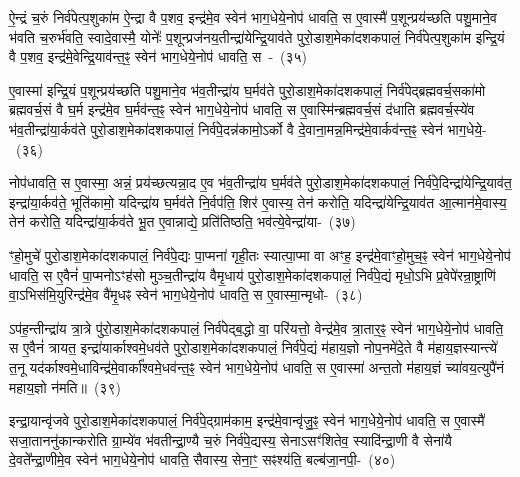 ऐ॒न्द्रं च॒रुं निर्व॑पेत्प॒शुका॑म ऐ॒न्द्रा वै प॒शव॒ इन्द्र॑मे॒व स्वेन॑ भाग॒\-धेये॒नोप॑ धावति॒ स ए॒वास्मै॑ प॒शून्प्रय॑च्छति पशु॒माने॒व भ॑वति च॒रुर्भ॑वति॒ स्वादे॒वास्मै॒ योनेः᳚ प॒शून्प्रज॑नय॒तीन्द्रा॑येन्द्रि॒याव॑ते पुरो॒डाश॒मेका॑\-दश\-कपालं॒ निर्व॑पेत्प॒शुका॑म इन्द्रि॒यं वै प॒शव॒ इन्द्र॑मे॒वेन्द्रि॒याव॑न्त॒ꣴ॒ स्वेन॑ भाग॒\-धेये॒नोप॑ धावति॒ स~-~(३५)\ip

ए॒वास्मा॑ इन्द्रि॒यं प॒शून्प्रय॑च्छति पशु॒माने॒व भ॑व॒तीन्द्रा॑य घ॒र्मव॑ते पुरो॒डाश॒मेका॑\-दश\-कपालं॒ निर्व॑पेद्ब्रह्मवर्च॒सका॑मो ब्रह्मवर्च॒सं वै घ॒र्म इन्द्र॑मे॒व घ॒र्मव॑न्त॒ꣴ॒ स्वेन॑ भाग॒\-धेये॒नोप॑ धावति॒ स ए॒वास्मि॑न्ब्रह्मवर्च॒सं द॑धाति ब्रह्मवर्च॒स्ये॑व भ॑व॒तीन्द्रा॑या॒र्कव॑ते पुरो॒डाश॒मेका॑\-दश\-कपालं॒ निर्व॑पे॒दन्न॑कामो॒\-ऽर्को वै दे॒वाना॒मन्न॒मिन्द्र॑मे॒वार्कव॑न्त॒ꣴ॒ स्वेन॑ भाग॒\-धेये॒-~(३६)\ip

नोप॑धावति॒ स ए॒वास्मा॒ अन्नं॒ प्रय॑च्छत्यन्ना॒द ए॒व भ॑व॒तीन्द्रा॑य घ॒र्मव॑ते पुरो॒डाश॒मेका॑\-दश\-कपालं॒ निर्व॑पे॒दिन्द्रा॑येन्द्रि॒याव॑त॒ इन्द्रा॑\-या॒र्कव॑ते॒ भूति॑कामो॒ यदिन्द्रा॑य घ॒र्मव॑ते नि॒र्वप॑ति॒ शिर॑ ए॒वास्य॒ तेन॑ करोति॒ यदिन्द्रा॑येन्द्रि॒याव॑त आ॒त्मान॑मे॒वास्य॒ तेन॑ करोति॒ यदिन्द्रा॑या॒र्कव॑ते भू॒त ए॒वान्नाद्ये॒ प्रति॑तिष्ठति॒ भव॑त्ये॒वेन्द्रा॑या-~(३७)\ip

ꣳहो॒मुचे॑ पुरो॒डाश॒मेका॑\-दश\-कपालं॒ निर्व॑पे॒द्यः पा॒प्मना॑ गृही॒तः स्यात्पा॒प्मा वा अꣳह॒ इन्द्र॑मे॒वाꣳहो॒मुच॒ꣴ॒ स्वेन॑ भाग॒\-धेये॒नोप॑ धावति॒ स ए॒वैनं॑ पा॒प्मनो\-ऽꣳह॑सो मुञ्च॒तीन्द्रा॑य वैमृ॒धाय॑ पुरो॒डाश॒मेका॑\-दश\-कपालं॒ निर्व॑पे॒द्यं मृधो॒\-ऽभि प्र॒वेपे॑रन्रा॒ष्ट्राणि॑ वा॒\-ऽभिस॑मि॒युरिन्द्र॑मे॒व वै॑मृ॒धꣴ स्वेन॑ भाग॒\-धेये॒नोप॑ धावति॒ स ए॒वास्मा॒न्मृधो-~(३८)\ip

ऽप॑ह॒न्तीन्द्रा॑य त्रा॒त्रे पु॑रो॒डाश॒मेका॑\-दश\-कपालं॒ निर्व॑पेद्ब॒द्धो वा॒ परि॑यत्तो॒ वेन्द्र॑मे॒व त्रा॒तार॒ꣴ॒ स्वेन॑ भाग॒\-धेये॒नोप॑ धावति॒ स ए॒वैनं॑ त्रायत॒ इन्द्रा॑यार्काश्वमे॒धव॑ते पुरो॒डाश॒मेका॑\-दश\-कपालं॒ निर्व॑पे॒द्यं म॑हाय॒ज्ञो नोप॒नमे॑दे॒ते वै म॑हाय॒ज्ञस्यान्त्ये॑ त॒नू यद॑र्काश्वमे॒धाविन्द्र॑मे॒वार्का᳚श्वमे॒धव॑न्त॒ꣴ॒ स्वेन॑ भाग॒\-धेये॒नोप॑ धावति॒ स ए॒वास्मा॑ अन्त॒तो म॑हाय॒ज्ञं च्या॑वय॒त्युपै॑नं महाय॒ज्ञो न॑मति॥~(३९)\ip

{\anuvakamend[{इ॒न्द्रि॒याव॑न्त॒ꣴ॒ स्वेन॑ भाग॒\-धेये॒नोप॑ धावति॒ सो᳚\-ऽर्कव॑न्त॒ꣴ॒ स्वेन॑ भाग॒\-धेये॑नै॒वेन्द्रा॑यास्मा॒न्मृधो᳚\-ऽस्मै स॒प्त च॑}]}

इन्द्रा॒यान्वृ॑जवे पुरो॒डाश॒मेका॑\-दश\-कपालं॒ निर्व॑पे॒द्ग्राम॑काम॒ इन्द्र॑मे॒वान्वृ॑जु॒ꣴ॒ स्वेन॑ भाग॒\-धेये॒नोप॑ धावति॒ स ए॒वास्मै॑ सजा॒ताननु॑कान्करोति ग्रा॒म्ये॑व भ॑वतीन्द्रा॒ण्यै च॒रुं निर्व॑पे॒द्यस्य॒ सेना\-ऽसꣳ॑शितेव॒ स्यादि॑न्द्रा॒णी वै सेना॑यै दे॒वते᳚न्द्रा॒णीमे॒व स्वेन॑ भाग॒\-धेये॒नोप॑ धावति॒ सैवास्य॒ सेना॒ꣳ॒ सꣴश्य॑ति॒ बल्ब॑जा॒नपी॒-~(४०)\ip

